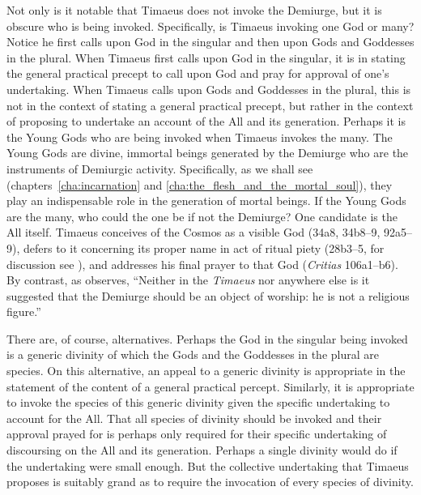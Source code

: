 Not only is it notable that Timaeus does not invoke the Demiurge, but it is obscure who is being invoked. Specifically, is Timaeus invoking one God or many? Notice he first calls upon God in the singular and then upon Gods and Goddesses in the plural. When Timaeus first calls upon God in the singular, it is in stating the general practical precept to call upon God and pray for approval of one's undertaking. When Timaeus calls upon Gods and Goddesses in the plural, this is not in the context of stating a general practical precept, but rather in the context of proposing to undertake an account of the All and its generation. Perhaps it is the Young Gods who are being invoked when Timaeus invokes the many. The Young Gods are divine, immortal beings generated by the Demiurge who are the instruments of Demiurgic activity. Specifically, as we shall see (chapters~\ref{cha:incarnation} and \ref{cha:the_flesh_and_the_mortal_soul}), they play an indispensable role in the generation of mortal beings. If the Young Gods are the many, who could the one be if not the Demiurge? One candidate is the All itself. Timaeus conceives of the Cosmos as a visible God (34a8, 34b8--9, 92a5--9), defers to it concerning its proper name in act of ritual piety (28b3--5, for discussion see \citealt[66]{Taylor:1928qb}), and addresses his final prayer to that God (\emph{Critias} 106a1--b6). By contrast, as \citet[35]{Cornford:1935fk} observes, ``Neither in the \emph{Timaeus} nor anywhere else is it suggested that the Demiurge should be an object of worship: he is not a religious figure.''

There are, of course, alternatives. Perhaps the God in the singular being invoked is a generic divinity of which the Gods and the Goddesses in the plural are species. On this alternative, an appeal to a generic divinity is appropriate in the statement of the content of a general practical percept. Similarly, it is appropriate to invoke the species of this generic divinity given the specific undertaking to account for the All. That all species of divinity should be invoked and their approval prayed for is perhaps only required for their specific undertaking of discoursing on the All and its generation. Perhaps a single divinity would do if the undertaking were small enough. But the collective undertaking that Timaeus proposes is suitably grand as to require the invocation of every species of divinity.

